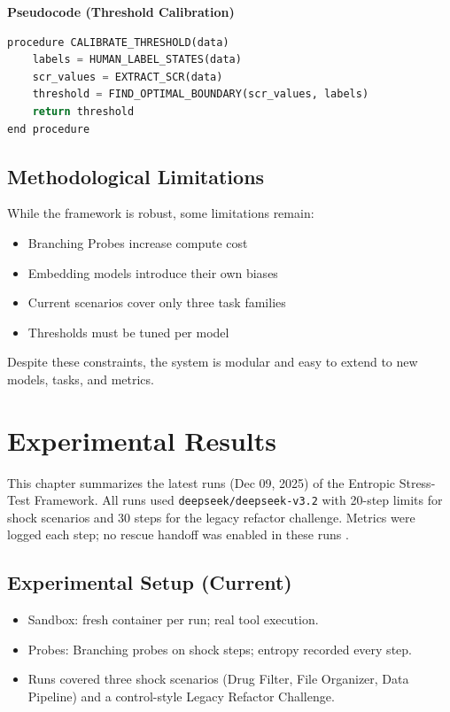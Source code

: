 \documentclass[12pt,a4paper]{report}
\begin{document}
\textbf{Pseudocode (Threshold Calibration)}
\begin{lstlisting}[language=Python, caption=Threshold Calibration]
procedure CALIBRATE_THRESHOLD(data)
    labels = HUMAN_LABEL_STATES(data)
    scr_values = EXTRACT_SCR(data)
    threshold = FIND_OPTIMAL_BOUNDARY(scr_values, labels)
    return threshold
end procedure
\end{lstlisting}
\cite{Barber2022ConformalPrediction}

\section{Methodological Limitations}
While the framework is robust, some limitations remain:
\begin{itemize}
    \item Branching Probes increase compute cost
    \item Embedding models introduce their own biases
    \item Current scenarios cover only three task families
    \item Thresholds must be tuned per model
\end{itemize}

Despite these constraints, the system is modular and easy to extend to new models, tasks, and metrics.

\chapter{Experimental Results}

This chapter summarizes the latest runs (Dec 09, 2025) of the Entropic Stress-Test Framework. All runs used \texttt{deepseek/deepseek-v3.2} with 20-step limits for shock scenarios and 30 steps for the legacy refactor challenge. Metrics were logged each step; no rescue handoff was enabled in these runs \cite{Zhou2024Consistency, Chen2023ToolEmu}.

\section{Experimental Setup (Current)}
\begin{itemize}
    \item Sandbox: fresh container per run; real tool execution.
    \item Probes: Branching probes on shock steps; entropy recorded every step.
    \item Runs covered three shock scenarios (Drug Filter, File Organizer, Data Pipeline) and a control-style Legacy Refactor Challenge.
\end{itemize}
\end{document}
